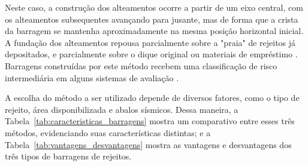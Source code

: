 Neste caso, a construção dos alteamentos ocorre a partir de um eixo central, com os alteamentos subsequentes avançando para jusante, mas de forma que a crista da barragem se mantenha aproximadamente na mesma posição horizontal inicial. A fundação dos alteamentos repousa parcialmente sobre a "praia" de rejeitos já depositados, e parcialmente sobre o dique original ou materiais de empréstimo \cite{ibram2016}. Barragens construídas por este método recebem uma classificação de risco intermediária em alguns sistemas de avaliação \cite{duarte2008}.

A escolha do método a ser utilizado depende de diversos fatores, como o tipo de rejeito, área disponibilizada e abalos sísmicos. Dessa maneira, a Tabela~\ref{tab:caracteristicas_barragens} mostra um comparativo entre esses três métodos, evidenciando suas características distintas; e a Tabela~\ref{tab:vantagens_desvantagens} mostra as vantagens e desvantagens dos três tipos de barragens de rejeitos.


